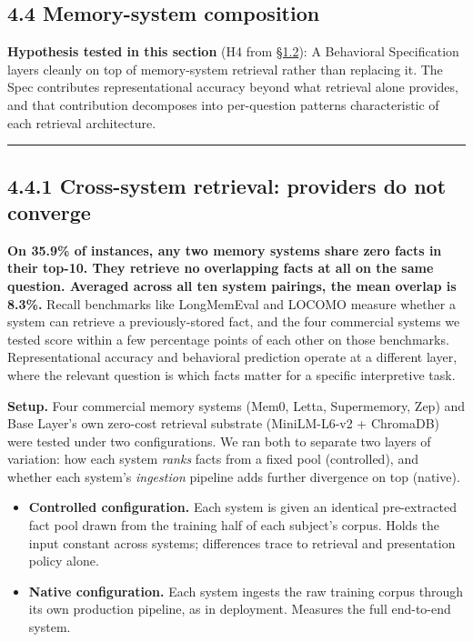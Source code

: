 \hypertarget{memory-system-composition}{%
\subsection{4.4 Memory-system
composition}\label{memory-system-composition}}

\textbf{Hypothesis tested in this section} (H4 from \hyperref[what-we-tested]{§1.2}): A Behavioral
Specification layers cleanly on top of memory-system retrieval rather
than replacing it. The Spec contributes representational accuracy beyond
what retrieval alone provides, and that contribution decomposes into
per-question patterns characteristic of each retrieval architecture.

\begin{center}\rule{0.5\linewidth}{0.5pt}\end{center}

\hypertarget{cross-system-retrieval-providers-do-not-converge}{%
\subsection{4.4.1 Cross-system retrieval: providers do not
converge}\label{cross-system-retrieval-providers-do-not-converge}}

\textbf{On 35.9\% of instances, any two memory systems share zero facts
in their top-10. They retrieve no overlapping facts at all on the same
question. Averaged across all ten system pairings, the mean overlap is
8.3\%.} Recall benchmarks like LongMemEval and LOCOMO measure whether a
system can retrieve a previously-stored fact, and the four commercial
systems we tested score within a few percentage points of each other on
those benchmarks. Representational accuracy and behavioral prediction
operate at a different layer, where the relevant question is which facts
matter for a specific interpretive task.

\textbf{Setup.} Four commercial memory systems (Mem0, Letta,
Supermemory, Zep) and Base Layer's own zero-cost retrieval substrate
(MiniLM-L6-v2 + ChromaDB) were tested under two configurations. We ran
both to separate two layers of variation: how each system \emph{ranks}
facts from a fixed pool (controlled), and whether each system's
\emph{ingestion} pipeline adds further divergence on top (native).

\begin{itemize}
\tightlist
\item
  \textbf{Controlled configuration.} Each system is given an identical
  pre-extracted fact pool drawn from the training half of each subject's
  corpus. Holds the input constant across systems; differences trace to
  retrieval and presentation policy alone.
\item
  \textbf{Native configuration.} Each system ingests the raw training
  corpus through its own production pipeline, as in deployment. Measures
  the full end-to-end system.
\end{itemize}

